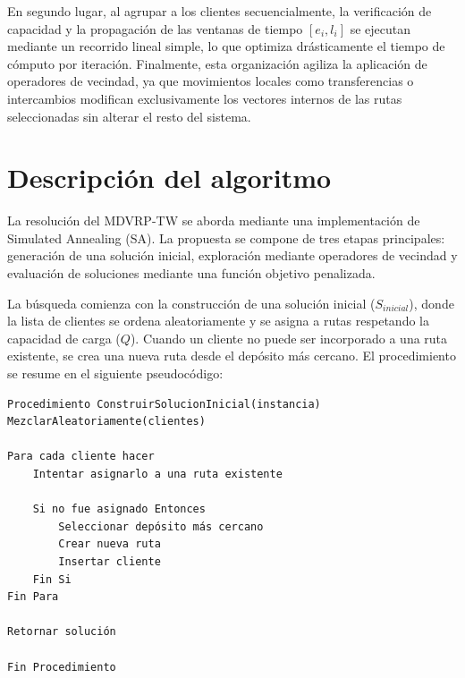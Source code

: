 \documentclass[letter, 10pt, dvipdfmx]{article}
\begin{document}
En segundo lugar, al agrupar a los clientes secuencialmente, la verificación de capacidad y la propagación de las
ventanas de tiempo $[e_i, l_i]$ se ejecutan mediante un recorrido lineal simple, lo que optimiza drásticamente el
tiempo de cómputo por iteración. Finalmente, esta organización agiliza la aplicación de operadores
de vecindad, ya que movimientos locales como transferencias o intercambios modifican exclusivamente los vectores
internos de las rutas seleccionadas sin alterar el resto del sistema.

\section{Descripción del algoritmo}
La resolución del MDVRP-TW se aborda mediante una implementación de Simulated Annealing (SA). La propuesta se compone
de tres etapas principales: generación de una solución inicial, exploración mediante operadores de vecindad
y evaluación de soluciones mediante una función objetivo penalizada.

La búsqueda comienza con la construcción de una solución inicial ($S_{inicial}$), donde la lista de clientes
se ordena aleatoriamente y se asigna a rutas respetando la capacidad de carga ($Q$). Cuando un
cliente no puede ser incorporado a una ruta existente, se crea una nueva ruta desde el depósito más cercano.
El procedimiento se resume en el siguiente pseudocódigo:

{\footnotesize
\begin{verbatim}
Procedimiento ConstruirSolucionInicial(instancia)
MezclarAleatoriamente(clientes)

Para cada cliente hacer
    Intentar asignarlo a una ruta existente

    Si no fue asignado Entonces
        Seleccionar depósito más cercano
        Crear nueva ruta
        Insertar cliente
    Fin Si
Fin Para

Retornar solución

Fin Procedimiento
\end{verbatim}
}
\end{document}
